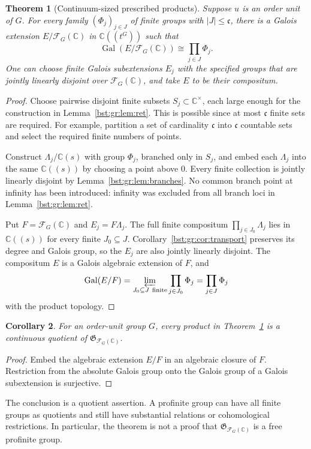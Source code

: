 \documentclass[11pt,letterpaper]{article}
\newtheorem{theorem}{Theorem}[section]
\newtheorem{corollary}[theorem]{Corollary}
\theoremstyle{definition}
\theoremstyle{remark}
\newcommand{\C}{\mathbb C}
\newcommand{\HH}[2]{#1((t^{#2}))}
\newcommand{\FF}[2]{\mathcal F_{#2}(#1)}
\newcommand{\cc}{\mathfrak c}
\newcommand{\abs}[1]{\lvert #1\rvert}
\newcommand{\Gal}{\operatorname{Gal}}
\newcommand{\AbsGal}[1]{\mathfrak G_{#1}}
\begin{document}
\begin{theorem}[Continuum-sized prescribed products]\label{bst:gr:thm:products}
Suppose $u$ is an order unit of $G$. For every family $(\Phi_j)_{j\in J}$ of
finite groups with $\abs{J}\leq\cc$, there is a Galois extension
$E/\FF{\C}G$ in $\HH{\C}G$ such that
\[
 \Gal(E/\FF{\C}G)\cong\prod_{j\in J}\Phi_j.
\]
One can choose finite Galois subextensions $E_j$ with the specified groups
that are jointly linearly disjoint over $\FF{\C}G$, and take $E$ to be their
compositum.
\end{theorem}
\begin{proof}
Choose pairwise disjoint finite subsets $S_j\subset\C^\times$, each large
enough for the construction in Lemma~\ref{bst:gr:lem:ret}. This is possible
since at most $\cc$ finite sets are required. For example, partition a set
of cardinality $\cc$ into $\cc$ countable sets and select the required
finite numbers of points.

Construct $\Lambda_j/\C(s)$ with group $\Phi_j$, branched only in $S_j$, and
embed each $\Lambda_j$ into the same $\C((s))$ by choosing a point above $0$.
Every finite collection is jointly linearly disjoint by
Lemma~\ref{bst:gr:lem:branches}. No common branch point at infinity has been
introduced: infinity was excluded from all branch loci in
Lemma~\ref{bst:gr:lem:ret}.

Put $F=\FF{\C}G$ and $E_j=F\Lambda_j$. The full finite compositum
$\prod_{j\in J_0}\Lambda_j$ lies in $\C((s))$ for every finite
$J_0\subseteq J$. Corollary~\ref{bst:gr:cor:transport} preserves its degree
and Galois group, so the $E_j$ are also jointly linearly disjoint. The
compositum $E$ is a Galois algebraic extension of $F$, and
\[
 \Gal(E/F)=\varprojlim_{J_0\subseteq J\ \mathrm{finite}}\prod_{j\in J_0}\Phi_j
          =\prod_{j\in J}\Phi_j
\]
with the product topology.
\end{proof}

\begin{corollary}\label{bst:gr:cor:absquotient}
For an order-unit group $G$, every product in
Theorem~\ref{bst:gr:thm:products} is a continuous quotient of
$\AbsGal{\FF{\C}G}$.
\end{corollary}
\begin{proof}
Embed the algebraic extension $E/F$ in an algebraic closure of $F$.
Restriction from the absolute Galois group onto the Galois group of a
Galois subextension is surjective.
\end{proof}

The conclusion is a quotient assertion. A profinite group can have all
finite groups as quotients and still have substantial relations or
cohomological restrictions. In particular, the theorem is not a proof that
$\AbsGal{\FF{\C}G}$ is a free profinite group.
\end{document}
